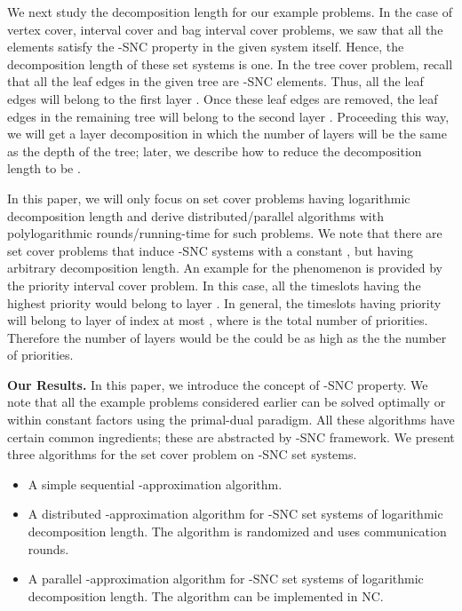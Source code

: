 \documentclass[11pt]{article}
\begin{document}
We next study the decomposition length for our example problems.
In the case of vertex cover, interval cover and bag interval cover problems,
we saw that all the elements satisfy the -SNC property in the given system  itself.
Hence, the decomposition length of these set systems is one.
In the tree cover problem, recall that all the leaf edges in the given tree  are -SNC elements.
Thus, all the leaf edges will belong to the first layer . Once these leaf edges are removed,
the leaf edges in the remaining tree will belong to the second layer .
Proceeding this way, we will get a layer decomposition in which the number of layers will be
the same as the depth of the tree; later, we describe how to reduce the decomposition length to be .

In this paper, we will only focus on set cover problems having logarithmic decomposition length 
and derive distributed/parallel algorithms with polylogarithmic rounds/running-time for such problems.
We note that there are set cover problems that induce -SNC systems with a constant , 
but having arbitrary decomposition length. An example for the phenomenon is provided by the priority interval cover problem. 
In this case, all the timeslots having the highest priority would belong to layer .
In general, the timeslots having priority  will belong to layer of index at most , where  is the total number of priorities.
Therefore the number of layers would be the could be as high as the the number of priorities.

{\bf Our Results. }In this paper, we introduce the concept of -SNC property.
We note that all the example problems considered earlier can be solved optimally or within constant factors
using the primal-dual paradigm. All these algorithms have certain common ingredients;
these are abstracted by -SNC framework.
We present three algorithms for the set cover problem on -SNC set systems.
\begin{itemize}
\item
A simple sequential -approximation algorithm.
\item 
A distributed -approximation algorithm for -SNC set systems of logarithmic decomposition length.
The algorithm is randomized and uses  communication rounds.
\item
A parallel -approximation algorithm for -SNC set systems of logarithmic decomposition length.
The algorithm can be implemented in NC.
\end{itemize}
\end{document}
